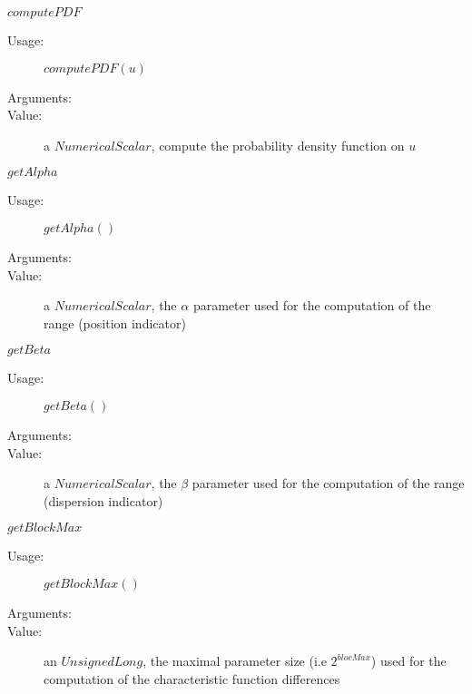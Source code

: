 \begin{description}
\begin{description}
  \item $computePDF$
    \begin{description}
    \item[Usage:]  $computePDF(u)$
    \item[Arguments:]  \strut
    \item[Value:] a $NumericalScalar$, compute the probability density function on $u$
    \end{description}

  \item $getAlpha$
    \begin{description}
    \item[Usage:]  $getAlpha()$
    \item[Arguments:]  \strut
    \item[Value:] a $NumericalScalar$, the $\alpha$ parameter used for the computation of the range (position indicator)
    \end{description}

  \item $getBeta$
    \begin{description}
    \item[Usage:]  $getBeta()$
    \item[Arguments:]  \strut
    \item[Value:] a $NumericalScalar$, the $\beta$ parameter used for the computation of the range (dispersion indicator)
    \end{description}

  \item $getBlockMax$
    \begin{description}
    \item[Usage:]  $getBlockMax()$
    \item[Arguments:]  \strut
    \item[Value:] an $UnsignedLong$, the maximal parameter size (i.e $2^{blocMax}$) used for the computation of the characteristic function differences
    \end{description}


\end{description}
\end{description}
